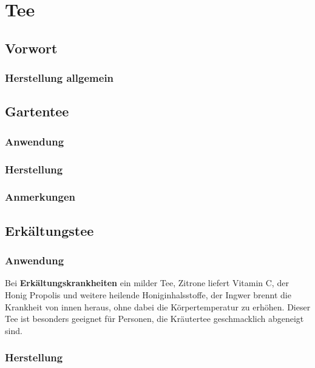 \chapter{Tee}

\section{Vorwort}

\lipsum[1-5]
\newpage



\subsection{Herstellung allgemein}



\section{Gartentee}

\subsection{Anwendung}

\subsection{Herstellung}

\subsection{Anmerkungen}




\section{Erkältungstee}

\subsection{Anwendung}

Bei \textbf{Erkältungskrankheiten} ein milder Tee, Zitrone liefert Vitamin C, der Honig Propolis und weitere heilende Honiginhalsstoffe, der Ingwer brennt die Krankheit von innen heraus, ohne dabei die Körpertemperatur zu erhöhen. Dieser Tee ist besonders geeignet für Personen, die Kräutertee geschmacklich abgeneigt sind.

\subsection{Herstellung}

